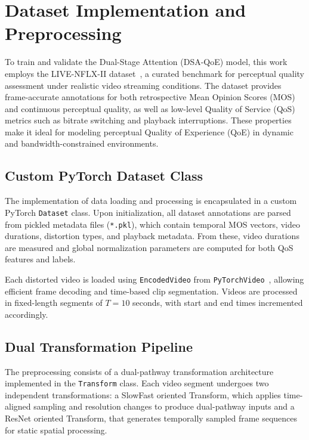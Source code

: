 \section{Dataset Implementation and Preprocessing}

To train and validate the Dual-Stage Attention (DSA-QoE) model, this work employs the LIVE-NFLX-II dataset~\cite{live_nflx_conf}, a curated benchmark for perceptual quality assessment under realistic video streaming conditions. The dataset provides frame-accurate annotations for both retrospective Mean Opinion Scores (MOS) and continuous perceptual quality, as well as low-level Quality of Service (QoS) metrics such as bitrate switching and playback interruptions. These properties make it ideal for modeling perceptual Quality of Experience (QoE) in dynamic and bandwidth-constrained environments.

\subsection{Custom PyTorch Dataset Class}

The implementation of data loading and processing is encapsulated in a custom PyTorch \texttt{Dataset} class. Upon initialization, all dataset annotations are parsed from pickled metadata files (\texttt{*.pkl}), which contain temporal MOS vectors, video durations, distortion types, and playback metadata. From these, video durations are measured and global normalization parameters are computed for both QoS features and labels.

Each distorted video is loaded using \texttt{EncodedVideo} from \texttt{PyTorchVideo}~\cite{fan2021pytorchvideodeeplearninglibrary}, allowing efficient frame decoding and time-based clip segmentation. Videos are processed in fixed-length segments of $T = 10$ seconds, with start and end times incremented accordingly.

\subsection{Dual Transformation Pipeline}

The preprocessing consists of a dual-pathway transformation architecture implemented in the \texttt{Transform} class. Each video segment undergoes two independent transformations: a SlowFast oriented Transform, which applies time-aligned sampling and resolution changes to produce dual-pathway inputs and a ResNet oriented Transform, that generates temporally sampled frame sequences for static spatial processing.

